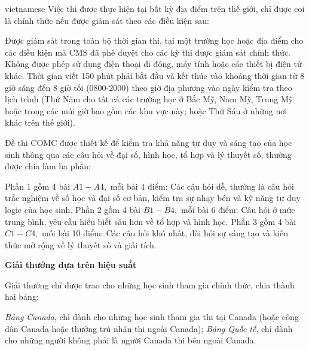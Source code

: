\documentclass{article}
\begin{document}
\begin{otherlanguage*}{vietnamese}
\bigbreak
Việc thi được thực hiện tại bất kỳ địa điểm trên thế giới, chỉ được coi là chính thức nếu được giám sát theo các điều kiện sau:
\begin{itemize}[topsep=0pt, partopsep=0pt, itemsep=0pt]
    \ii Được giám sát trong toàn bộ thời gian thi, tại một trường học hoặc địa điểm cho các điều kiện mà CMS đã phê duyệt cho các kỳ thi được giám sát chính thức.
    \ii Không được phép sử dụng điện thoại di động, máy tính hoặc các thiết bị điện tử khác.
    \ii Thời gian viết 150 phút phải bắt đầu và kết thúc vào khoảng thời gian từ 8 giờ sáng đến 8 giờ tối (0800-2000) theo giờ địa phương vào ngày kiểm tra theo lịch trình
    (Thứ Năm cho tất cả các trường học ở Bắc Mỹ, Nam Mỹ, Trung Mỹ hoặc trong các múi giờ bao gồm các khu vực này; hoặc Thứ Sáu ở những nơi khác trên thế giới).
\end{itemize}

\bigbreak
Đề thi COMC được thiết kế để kiểm tra khả năng tư duy và sáng tạo của học sinh thông qua các câu hỏi về đại số, hình học, tổ hợp và lý thuyết số, thường được chia làm ba phần:
\begin{itemize}[topsep=0pt, partopsep=0pt, itemsep=0pt]
    \ii Phần 1 gồm 4 bài $A1-A4,$ mỗi bài 4 điểm: Các câu hỏi dễ, thường là câu hỏi trắc nghiệm về số học và đại số cơ bản, kiểm tra sự nhạy bén và kỹ năng tư duy logic của học sinh.
    \ii Phần 2 gồm 4 bài $B1-B4,$ mỗi bài 6 điểm: Câu hỏi ở mức trung bình, yêu cầu hiểu biết sâu hơn về tổ hợp và hình học.
    \ii Phần 3 gồm 4 bài $C1-C4,$ mỗi bài 10 điểm: Các câu hỏi khó nhất, đòi hỏi sự sáng tạo và kiến thức mở rộng về lý thuyết số và giải tích.
\end{itemize}

\newpage
\textbf{Giải thưởng dựa trên hiệu suất}

Giải thưởng chỉ được trao cho những học sinh tham gia chính thức, chia thành hai bảng: 
\begin{itemize}[topsep=0pt, partopsep=0pt, itemsep=0pt]
    \ii \textit{Bảng Canada}, chỉ dành cho những học sinh tham gia thi tại Canada (hoặc công dân Canada hoặc thường trú nhân thi ngoài Canada); 
    \ii \textit{Bảng Quốc tế}, chỉ dành cho những người không phải là người Canada thi bên ngoài Canada.
\end{itemize}


\end{otherlanguage*}
\end{document}

